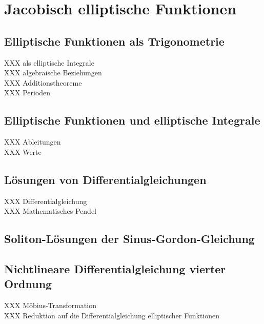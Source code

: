 %
%
%
\section{Jacobisch elliptische Funktionen
\label{buch:elliptisch:section:jacobi}}

\subsection{Elliptische Funktionen als Trigonometrie}
XXX als elliptische Integrale \\
XXX algebraische Beziehungen \\
XXX Additionstheoreme \\
XXX Perioden

\subsection{Elliptische Funktionen und elliptische Integrale}
XXX Ableitungen \\
XXX Werte \\

\subsection{Lösungen von Differentialgleichungen}
XXX Differentialgleichung \\
XXX Mathematisches Pendel \\

\subsection{Soliton-Lösungen der Sinus-Gordon-Gleichung}

\subsection{Nichtlineare Differentialgleichung vierter Ordnung}
XXX Möbius-Transformation \\
XXX Reduktion auf die Differentialgleichung elliptischer Funktionen
